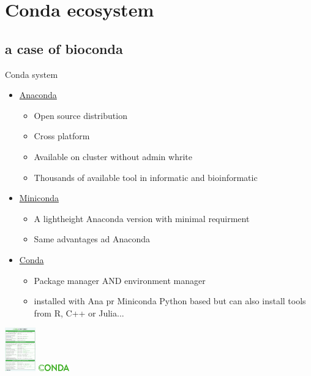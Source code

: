 \section{Conda ecosystem}
\subsection{a case of bioconda}

\begin{frame}{Conda system}
\begin{itemize}
\item \hyperlink{https://www.anaconda.com/}{Anaconda}
	\begin{itemize}
	\item Open source distribution
    \item Cross platform
    \item Available on cluster without admin whrite
    \item Thousands of available tool in informatic and bioinformatic
	\end{itemize}
\item \hyperlink{https://docs.conda.io/en/latest/miniconda.html}{Miniconda}
	\begin{itemize}
	\item A lightheight Anaconda version with minimal requirment
	\item Same advantages ad Anaconda
	\end{itemize}
\item \hyperlink{https://docs.conda.io/projects/conda/en/latest/index.html}{Conda}
	\begin{itemize}
	\item Package manager AND environment manager
	\item installed with Ana pr Miniconda
	\itme Python based but can also install tools from R, C++ or Julia...
	\end{itemize}
\end{itemize}
\includegraphics[width=0.1\textwidth]{images/conda_sheet_4.12.pdf} 
\includegraphics[width=0.1\textwidth]{images/conda_logo.pdf} 
\end{frame}


